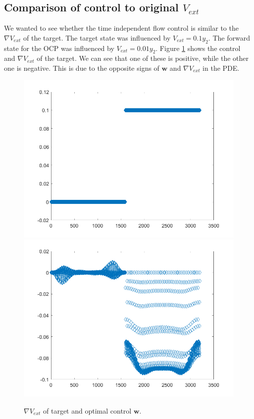 \documentclass[11pt, a4paper]{article}
\theoremstyle{definition}
\newcommand{\w}{\mathbf{w}}
\begin{document}
	
	
	
	
	\subsection{Comparison of control to original $V_{ext}$}
	We wanted to see whether the time independent flow control is similar to the $\nabla V_{ext}$ of the target.
	The target state was influenced by $V_{ext} = 0.1 y_2$. The forward state for the OCP was influenced by $V_{ext} = 0.01 y_2$. 
	Figure \ref{F1} shows the control and $\nabla V_{ext}$ of the target. We can see that one of these is positive, while the other one is negative. This is due to the opposite signs of $\w$ and $\nabla V_{ext}$ in the PDE.
	
	\begin{figure}[h]
		\centering
		\includegraphics[scale=0.35]{V1.png}
		\includegraphics[scale=0.35]{W1.png}
		\caption{$\nabla V_{ext}$ of target and optimal control $\w$.} 
		\label{F1}
	\end{figure}
	
\end{document}
